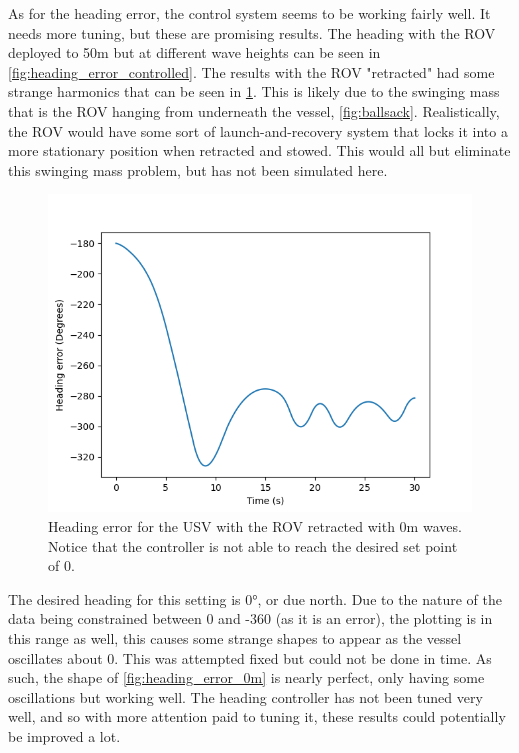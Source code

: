 \documentclass[class=article, crop=false]{standalone}
\begin{document}
As for the heading error, the control system seems to be working fairly well. It needs more tuning, but these are promising results. The heading with the ROV deployed to 50m but at different wave heights can be seen in \cref{fig:heading_error_controlled}. The results with the ROV "retracted" had some strange harmonics that can be seen in \cref{fig:heading_swinging}. This is likely due to the swinging mass that is the ROV hanging from underneath the vessel, \cref{fig:ballsack}. Realistically, the ROV would have some sort of launch-and-recovery system that locks it into a more stationary position when retracted and stowed. This would all but eliminate this swinging mass problem, but has not been simulated here.

\begin{figure}
    \centering
    \includegraphics{scenario1/rov-0m/0.0m/usv_heading_error_controlled}
    \caption{Heading error for the USV with the ROV retracted with 0m waves. Notice that the controller is not able to reach the desired set point of 0.}
    \label{fig:heading_swinging}
\end{figure}

The desired heading for this setting is 0°, or due north. Due to the nature of the data being constrained between 0 and -360 (as it is an error), the plotting is in this range as well, this causes some strange shapes to appear as the vessel oscillates about 0. This was attempted fixed but could not be done in time. As such, the shape of \cref{fig:heading_error_0m} is nearly perfect, only having some oscillations but working well. The heading controller has not been tuned very well, and so with more attention paid to tuning it, these results could potentially be improved a lot.
\end{document}
